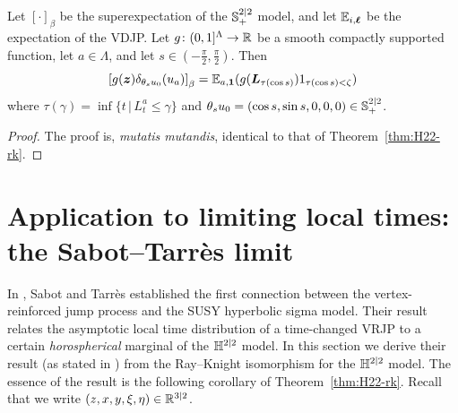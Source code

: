 \documentclass[11pt,a4paper]{article}
\begin{document}
\begin{theorem} 
  \label{thm:S22-rk}
  Let $[\cdot]_\beta$ be the superexpectation of the ${\mathbb S}_+^{2|2}$ model, and let $\mathbb{E}_{i,\boldsymbol{\ell}}$ be the expectation of the VDJP.
  Let $g\colon(0,1]^{\Lambda}\to \mathbb{R}$ be a smooth compactly supported function,
  let $a\in\Lambda$, and let $s\in(-\frac{\pi}{2},\frac{\pi}{2})$.  Then
  \begin{equation}
    \uspin{ g(\V{z})\delta_{\theta_s u_0}(u_a)}_\beta =
    \E_{a,\V{1}}(g(\V{L}_{\tau(\cos{s})})1_{\tau(\cos s)<\death})
  \end{equation}
  where $\tau(\gamma) = \inf \{t \,| \,L_t^a \le \gamma\}$ and
 $\theta_s u_0=(\cos{s},\sin{s},0,0,0)\in {\ensuremath{\mathbb S}}^{2|2}_{+}$.
\end{theorem}

\begin{proof}
  The proof is, \emph{mutatis mutandis}, identical to that of
  Theorem~\ref{thm:H22-rk}.
\end{proof}



\section{Application to limiting local times: the Sabot--Tarr\`{e}s limit}
\label{sec:ST}

In \cite{MR3420510}, Sabot and Tarr\`{e}s established the first connection
between the vertex-reinforced jump process and the SUSY hyperbolic
sigma model. Their result relates the asymptotic local time
distribution of a time-changed VRJP to a certain \emph{horospherical}
marginal of the $\mathbb{H}^{2|2}$ model.  In this section we derive their
result (as stated in \cite[Appendix~B]{MR3729620}) from the
Ray--Knight isomorphism for the $\mathbb{H}^{2|2}$ model.
The essence of the result is the following
corollary of Theorem~\ref{thm:H22-rk}.
Recall that we write $(z,x,y,\xi,\eta)\in \mathbb{R}^{3|2}$.
\end{document}
